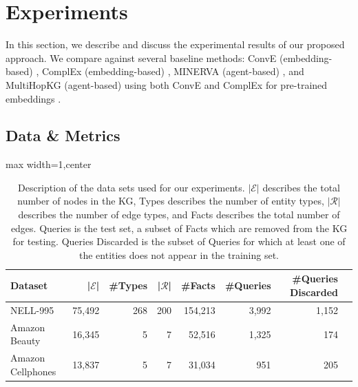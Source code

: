 \section{Experiments}
\label{experiments}
In this section, we describe and discuss the experimental results of our proposed approach. We compare against several baseline methods: ConvE (embedding-based) \cite{dettmers2018convolutional}, ComplEx (embedding-based) \cite{trouillon2016complex}, MINERVA (agent-based) \cite{das2017go}, and MultiHopKG (agent-based) using both ConvE and ComplEx for pre-trained embeddings \cite{lin2018multi}.


\label{entity_rep}
\subsection{Data \& Metrics} \label{sec:data}
\vspace{-10pt}
\begin{table}
    \small
    \begin{adjustbox}{max width=1\textwidth,center}
    \centering
    \setlength\tabcolsep{4pt}
    \begin{tabular}{|l|r|r|r|r|r|r|r|}
        \hline
        \textbf{Dataset} & \textbf{|$\mathcal{E}$|}  & \textbf{\#Types} & \textbf{|$\mathcal{R}$|} & \textbf{\#Facts} & \textbf{\#Queries} & \textbf{\#Queries Discarded} \\ \hline 
        NELL-995 & 75,492 & 268 & 200 & 154,213 & 3,992 & 1,152 \\ \hline 
        Amazon Beauty & 16,345 & 5 & 7 & 52,516 & 1,325 & 174 \\ \hline   %
        Amazon Cellphones & 13,837 & 5 & 7 & 31,034 & 951 & 205 \\ \hline   %
        \end{tabular}
    \end{adjustbox}
    \caption{Description of the data sets used for our experiments. $|\mathcal{E}|$ describes the total number of nodes in the KG, Types describes the number of entity types, $|\mathcal{R}|$ describes the number of edge types, and Facts describes the total number of edges. Queries is the test set, a subset of Facts which are removed from the KG for testing. Queries Discarded is the subset of Queries for which at least one of the entities does not appear in the training set.}
    \label{tab:data}
\end{table}
\vspace{-20pt}

